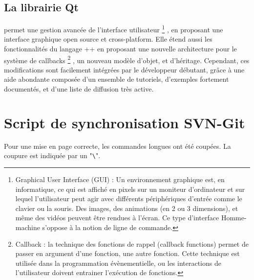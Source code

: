 \section*{La librairie Qt} permet une gestion avancée de l'interface utilisateur
\footnote{Graphical User Interface (GUI) : Un environnement graphique est, en informatique, ce qui est affiché en pixels sur un moniteur
d'ordinateur et sur lequel l'utilisateur peut agir avec différents périphériques d'entrée comme le clavier ou la souris. 
Des images, des animations (en 2 ou 3 dimensions), et même des vidéos peuvent être rendues à l'écran.
Ce type d'interface Homme-machine s'oppose à la notion de ligne de commande.}
, en proposant une interface graphique open source et cross-platform.
Elle étend aussi les fonctionnalités du langage \C++ en proposant une nouvelle architecture pour le système de callbacks
\footnote{Callback : la technique des fonctions de rappel (callback functions) permet de passer en argument d'une fonction, une autre fonction. 
Cette technique est utilisée dans la programmation évènementielle, ou les interactions de l'utilisateur doivent entrainer l'exécution de fonctions.}
, un nouveau modèle d'objet, et d'héritage. Cependant, ces modifications sont facilement intégrées par le développeur débutant, grâce à une aide abondante composée d'un ensemble de tutoriels, d'exemples fortement documentés, et d'une liste de diffusion très active.

\chapter{Script de synchronisation SVN-Git}
\label{AnnexeScriptGIT}

Pour une mise en page correcte, les commandes longues ont été coupées. La coupure est indiquée par un "\verb+\+".

